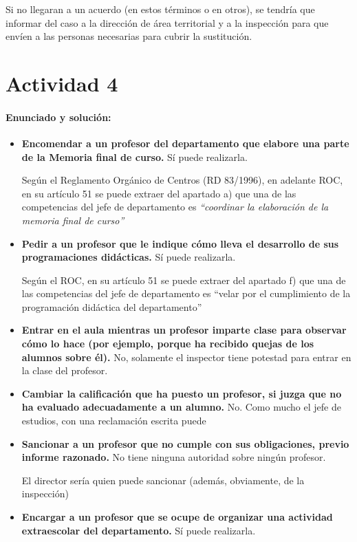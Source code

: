 Si no llegaran a un acuerdo (en estos términos o en otros), se tendría que informar del caso a la dirección de área territorial y a la inspección para que envíen a las personas necesarias para cubrir la sustitución.


\newpage
\section*{Actividad 4}
\paragraph{Enunciado y solución:}


\begin{itemize}

	\item \textbf{Encomendar a un profesor del departamento que elabore una parte de la Memoria final de curso.
}
	Sí puede realizarla.
 
	Según el Reglamento Orgánico de Centros (RD 83/1996), en adelante ROC, en su artículo 51 se puede extraer del apartado a) que una de las competencias del jefe de departamento es \textit{“coordinar la elaboración de la memoria final de curso”}

	\item \textbf{Pedir a un profesor que le indique cómo lleva el desarrollo de sus programaciones didácticas.
}
	Sí puede realizarla.

	Según el ROC, en su artículo 51 se puede extraer del apartado f) que una de las competencias del jefe de departamento es “velar por el cumplimiento de la programación didáctica del departamento”
	\item \textbf{Entrar en el aula mientras un profesor imparte clase para observar cómo lo hace (por ejemplo, porque ha recibido quejas de los alumnos sobre él).
}
	No, solamente el inspector tiene potestad para entrar en la clase del profesor.

	\item \textbf{Cambiar la calificación que ha puesto un profesor, si juzga que no ha evaluado adecuadamente a un alumno.
}
	No.
 Como mucho el jefe de estudios, con una reclamación escrita puede
	\item \textbf{Sancionar a un profesor que no cumple con sus obligaciones, previo informe razonado.
}
	No tiene ninguna autoridad sobre ningún profesor.
 
	El director sería quien puede sancionar (además, obviamente, de la inspección)
	\item \textbf{Encargar a un profesor que se ocupe de organizar una actividad extraescolar del departamento.
}
	Sí puede realizarla.


\end{itemize}
